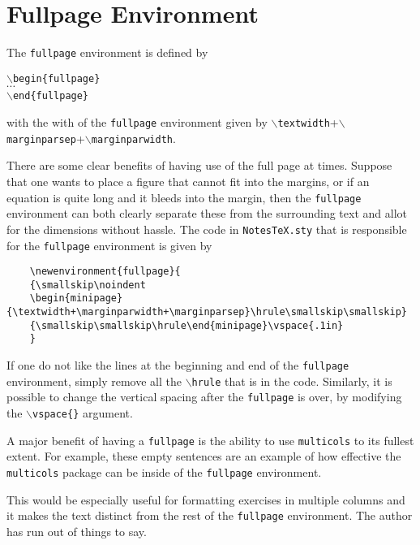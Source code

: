 \section{Fullpage Environment}\label{Sec: Fullpage}
\begin{fullpage}
  The \texttt{fullpage} environment is defined by
  \begin{center}
    \texttt{$\backslash$begin\{fullpage\}}\\
    $\cdots$\\
    \texttt{$\backslash$end\{fullpage\}}
  \end{center}
  with the with of the \texttt{fullpage} environment given by \texttt{$\backslash$textwidth}+\texttt{$\backslash$marginparsep}+\texttt{$\backslash$marginparwidth}.\\
\end{fullpage}
There are some clear benefits of having use of the full page at times. Suppose that one wants to place a figure that cannot fit into the margins, or if an equation is quite long and it bleeds into the margin, then the \texttt{fullpage} environment can both clearly separate these from the surrounding text and allot for the dimensions without hassle. The code in \texttt{NotesTeX.sty} that is responsible for the \texttt{fullpage} environment is given by\\

\begin{fullpage}
    \begin{verbatim}
    \newenvironment{fullpage}{
    {\smallskip\noindent
    \begin{minipage}{\textwidth+\marginparwidth+\marginparsep}\hrule\smallskip\smallskip}
    {\smallskip\smallskip\hrule\end{minipage}\vspace{.1in}
    }
    \end{verbatim}
\end{fullpage}

\begin{remark}
  If one do not like the lines at the beginning and end of the \texttt{fullpage} environment, simply remove all the \texttt{$\backslash$hrule} that is in the code. Similarly, it is possible to change the vertical spacing after the \texttt{fullpage} is over, by modifying the \texttt{$\backslash$vspace\{\}} argument. 
\end{remark}

\begin{fullpage}
  \begin{multicols}{2}
  A major benefit of having a \texttt{fullpage} is the ability to use \texttt{multicols} to its fullest extent. For example, these empty sentences are an example of how effective the \texttt{multicols} package can be inside of the \texttt{fullpage} environment. 

  This would be especially useful for formatting exercises in multiple columns and it makes the text distinct from the rest of the \texttt{fullpage} environment. The author has run out of things to say.
  \end{multicols}
\end{fullpage}

